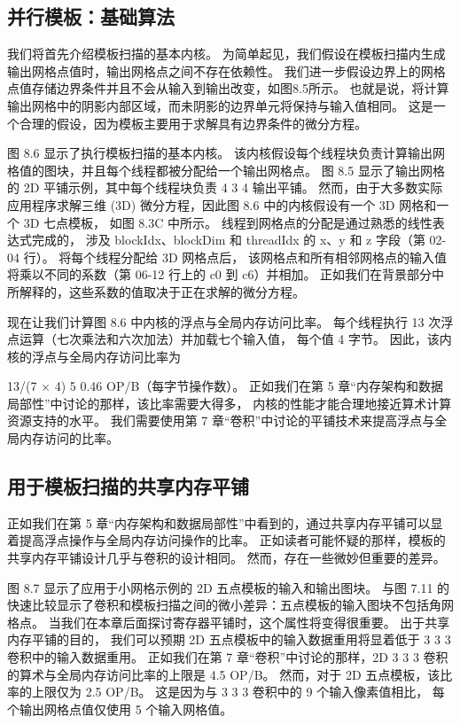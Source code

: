\subsection{并行模板：基础算法}
我们将首先介绍模板扫描的基本内核。 为简单起见，我们假设在模板扫描内生成输出网格点值时，输出网格点之间不存在依赖性。 
我们进一步假设边界上的网格点值存储边界条件并且不会从输入到输出改变，如图8.5所示。 
也就是说，将计算输出网格中的阴影内部区域，而未阴影的边界单元将保持与输入值相同。 
这是一个合理的假设，因为模板主要用于求解具有边界条件的微分方程。

图 8.6 显示了执行模板扫描的基本内核。 该内核假设每个线程块负责计算输出网格值的图块，并且每个线程都被分配给一个输出网格点。 
图 8.5 显示了输出网格的 2D 平铺示例，其中每个线程块负责 4 3 4 输出平铺。 
然而，由于大多数实际应用程序求解三维 (3D) 微分方程，因此图 8.6 中的内核假设有一个 3D 网格和一个 3D 七点模板，
如图 8.3C 中所示。 线程到网格点的分配是通过熟悉的线性表达式完成的，
涉及 blockIdx、blockDim 和 threadIdx 的 x、y 和 z 字段（第 02-04 行）。 将每个线程分配给 3D 网格点后，
该网格点和所有相邻网格点的输入值将乘以不同的系数（第 06-12 行上的 c0 到 c6）并相加。 
正如我们在背景部分中所解释的，这些系数的值取决于正在求解的微分方程。

现在让我们计算图 8.6 中内核的浮点与全局内存访问比率。 每个线程执行 13 次浮点运算（七次乘法和六次加法）并加载七个输入值，
每个值 4 字节。 因此，该内核的浮点与全局内存访问比率为

13/(7 × 4) 5 0.46 OP/B（每字节操作数）。 正如我们在第 5 章“内存架构和数据局部性”中讨论的那样，该比率需要大得多，
内核的性能才能合理地接近算术计算资源支持的水平。 我们需要使用第 7 章“卷积”中讨论的平铺技术来提高浮点与全局内存访问的比率。

\subsection{用于模板扫描的共享内存平铺}
正如我们在第 5 章“内存架构和数据局部性”中看到的，通过共享内存平铺可以显着提高浮点操作与全局内存访问操作的比率。 
正如读者可能怀疑的那样，模板的共享内存平铺设计几乎与卷积的设计相同。 然而，存在一些微妙但重要的差异。

图 8.7 显示了应用于小网格示例的 2D 五点模板的输入和输出图块。 
与图 7.11 的快速比较显示了卷积和模板扫描之间的微小差异：五点模板的输入图块不包括角网格点。 
当我们在本章后面探讨寄存器平铺时，这个属性将变得很重要。 出于共享内存平铺的目的，
我们可以预期 2D 五点模板中的输入数据重用将显着低于 3 3 3 卷积中的输入数据重用。 
正如我们在第 7 章“卷积”中讨论的那样，2D 3 3 3 卷积的算术与全局内存访问比率的上限是 4.5 OP/B。 
然而，对于 2D 五点模板，该比率的上限仅为 2.5 OP/B。 这是因为与 3 3 3 卷积中的 9 个输入像素值相比，
每个输出网格点值仅使用 5 个输入网格值。

